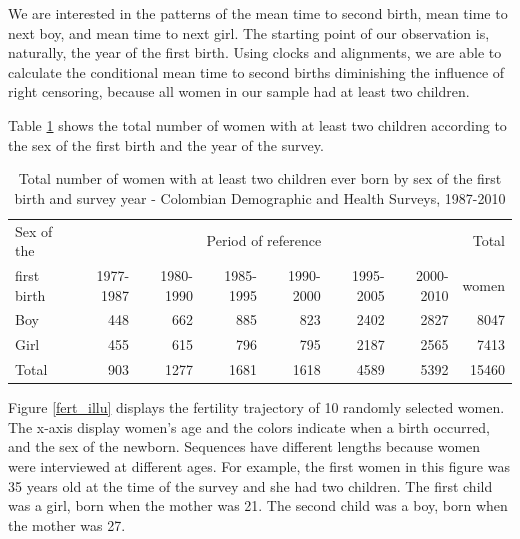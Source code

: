 \documentclass[a4paper,left=1.25cm,right=1.25cm,top=1.25cm,bottom=1.25cm]{article}
\begin{document}
We are interested in the patterns of the mean time to second birth, mean time to next boy, and mean time to next girl. The starting point of our observation is, naturally, the year of the first birth. Using clocks and alignments, we are able to calculate the conditional mean time to second births diminishing the influence of right censoring, because all women in our sample had at least two children. 

Table \ref{tfert_01} shows the total number of women with at least two children according to the sex of the first birth and the year of the survey. 

\begin{table}[ht]
\centering
\begin{tabular}{lrrrrrrr}
  \hline
Sex of the  & \multicolumn{6}{c}{Period of reference} & Total \\
first birth & 1977-1987 & 1980-1990 & 1985-1995 & 1990-2000 & 1995-2005 & 2000-2010 & women \\ 
  \hline
Boy & 448 & 662 & 885 & 823 & 2402 & 2827 & 8047 \\ 
Girl & 455 & 615 & 796 & 795 & 2187 & 2565 & 7413 \\\hline 
Total & 903 & 1277 & 1681 & 1618 & 4589 & 5392 & 15460 \\ 
   \hline
\end{tabular}
\caption{Total number of women with at least two children ever born by sex of the first birth and survey year - Colombian Demographic and Health Surveys, 1987-2010}
\label{tfert_01}
\end{table}

Figure \ref{fert_illu} displays the fertility trajectory of 10 randomly selected women. The x-axis display women's age and the colors indicate when a birth occurred, and the sex of the newborn. Sequences have different lengths because women were interviewed at different ages. For example, the first women in this figure was 35 years old at the time of the survey and she had two children. The first child was a girl, born when the mother was 21. The second child was a boy, born when the mother was 27.
\end{document}
